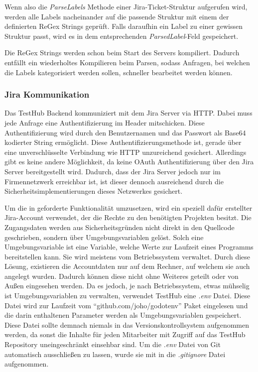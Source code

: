 Wenn also die \textit{ParseLabels} Methode einer Jira-Ticket-Struktur aufgerufen wird, werden
alle Labels nacheinander auf die passende Struktur mit einem der definierten ReGex Strings geprüft.
Falls daraufhin  ein Label zu einer gewissen Struktur passt, wird es in dem entsprechenden \textit{ParsedLabel}-Feld
gespeichert.

Die ReGex Strings werden schon beim Start des Servers kompiliert. Dadurch 
entfällt ein wiederholtes Kompilieren beim Parsen, sodass Anfragen, bei welchen
die Labels kategorisiert werden sollen, schneller bearbeitet werden können.

\subsubsection{\gls{Jira} Kommunikation}
Das TestHub Backend kommuniziert mit dem \gls{Jira} Server via \gls{HTTP}. Dabei muss 
jede Anfrage eine Authentifizierung im Header mitschicken. Diese Authentifizierung
wird durch den Benutzernamen und das Passwort als Base64 kodierter String ermöglicht.
Diese Authentifizierungsmethode ist, gerade über eine unverschlüsselte
Verbindung wie \gls{HTTP} unzureichend gesichert.
Allerdings gibt es keine andere Möglichkeit, da keine OAuth Authentifizierung über den
\gls{Jira} Server bereitgestellt wird.
Dadurch, dass der \gls{Jira} Server jedoch nur im Firmennetzwerk erreichbar ist,
ist dieser dennoch ausreichend durch die Sicherheitsimplementierungen dieses
Netzwerkes gesichert. 

Um die in  geforderte Funktionalität umzusetzen, 
wird ein speziell dafür erstellter Jira-Account verwendet, der die Rechte zu den benötigten Projekten besitzt.
Die Zugangsdaten werden aus Sicherheitsgründen nicht direkt in den Quellcode geschrieben, 
sondern über Umgebungsvariablen gelöst. Solch eine Umgebungsvariable ist eine Variable, 
welche Werte zur Laufzeit eines Programms bereitstellen kann. Sie wird meistens vom Betriebssystem verwaltet.
Durch diese Lösung, existieren die Accountdaten nur auf dem Rechner, auf welchem sie auch
angelegt wurden. Dadurch können diese nicht ohne Weiteres geteilt oder von Außen eingesehen werden.
Da es jedoch, je nach Betriebssystem, etwas mühselig ist Umgebungsvariablen zu
verwalten, verwendet TestHub eine \textit{.env} Datei. Diese Datei wird zur 
Laufzeit vom ``github.com/joho/godotenv''
Paket eingelesen und die darin enthaltenen Parameter werden als Umgebungsvariablen gespeichert.
Diese Datei sollte demnach niemals in das Versionskontrollsystem aufgenommen werden, da 
sonst die Inhalte für jeden Mitarbeiter mit Zugriff auf das TestHub Repository uneingeschränkt einsehbar sind.
Um die \textit{.env} Datei von Git automatisch ausschließen
zu lassen, wurde sie mit in die \textit{.gitignore} Datei aufgenommen.

